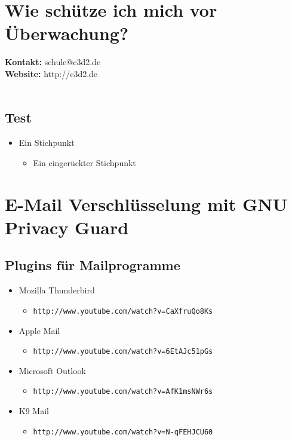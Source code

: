 \documentclass[a5paper]{scrartcl}
\begin{document}
\thispagestyle{empty}

\section*{Wie schütze ich mich vor Überwachung?}

\textbf{Kontakt:} schule@c3d2.de\\
\textbf{Website:} http://c3d2.de\\
\\
\subsection*{Test}
\begin{itemize}
  \item Ein Stichpunkt
    \begin{itemize}
      \item Ein eingerückter Stichpunkt
    \end{itemize}
\end{itemize}

\section*{E-Mail Verschlüsselung mit GNU Privacy Guard}
\subsection*{Plugins für Mailprogramme}
\begin{itemize}
   \item Mozilla Thunderbird
      \begin{itemize}
         \item \texttt{http://www.youtube.com/watch?v=CaXfruQo8Ks}  
      \end{itemize}       
   \item Apple Mail 
      \begin{itemize}
         \item \texttt{http://www.youtube.com/watch?v=6EtAJc51pGs}  
      \end{itemize}
   \item Microsoft Outlook 
      \begin{itemize}
         \item \texttt{http://www.youtube.com/watch?v=AfK1msNWr6s} 
      \end{itemize}
   \item K9 Mail
      \begin{itemize}
         \item \texttt{http://www.youtube.com/watch?v=N-qFEHJCU60} 
      \end{itemize}
\end{itemize}
\end{document}
